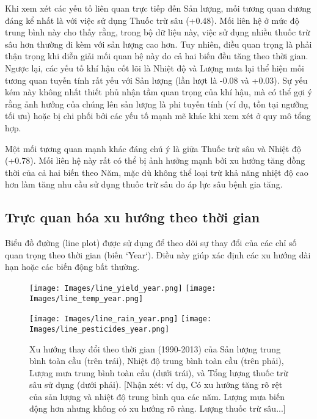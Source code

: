 Khi xem xét các yếu tố liên quan trực tiếp đến Sản lượng, mối tương quan dương đáng kể nhất là với việc sử dụng Thuốc trừ sâu (+0.48). Mối liên hệ ở mức độ trung bình này cho thấy rằng, trong bộ dữ liệu này, việc sử dụng nhiều thuốc trừ sâu hơn thường đi kèm với sản lượng cao hơn. Tuy nhiên, điều quan trọng là phải thận trọng khi diễn giải mối quan hệ này do cả hai biến đều tăng theo thời gian. Ngược lại, các yếu tố khí hậu cốt lõi là Nhiệt độ và Lượng mưa lại thể hiện mối tương quan tuyến tính rất yếu với Sản lượng (lần lượt là -0.08 và +0.03). Sự yếu kém này không nhất thiết phủ nhận tầm quan trọng của khí hậu, mà có thể gợi ý rằng ảnh hưởng của chúng lên sản lượng là phi tuyến tính (ví dụ, tồn tại ngưỡng tối ưu) hoặc bị chi phối bởi các yếu tố mạnh mẽ khác khi xem xét ở quy mô tổng hợp.

Một mối tương quan mạnh khác đáng chú ý là giữa Thuốc trừ sâu và Nhiệt độ (+0.78). Mối liên hệ này rất có thể bị ảnh hưởng mạnh bởi xu hướng tăng đồng thời của cả hai biến theo Năm, mặc dù không thể loại trừ khả năng nhiệt độ cao hơn làm tăng nhu cầu sử dụng thuốc trừ sâu do áp lực sâu bệnh gia tăng.



\subsection{Trực quan hóa xu hướng theo thời gian}
\label{subsec:viz_time_trends}

Biểu đồ đường (line plot) được sử dụng để theo dõi sự thay đổi của các chỉ số quan trọng theo thời gian (biến `Year`). Điều này giúp xác định các xu hướng dài hạn hoặc các biến động bất thường.

\begin{figure}[H]
    \centering
    \texttt{[image: Images/line\_yield\_year.png]}
    \hfill
    \texttt{[image: Images/line\_temp\_year.png]}
    
    \vspace{0.5cm}
    
    \texttt{[image: Images/line\_rain\_year.png]}
     \hfill
    \texttt{[image: Images/line\_pesticides\_year.png]}
   \vspace{8pt}
    \caption{Xu hướng thay đổi theo thời gian (1990-2013) của Sản lượng trung bình toàn cầu (trên trái), Nhiệt độ trung bình toàn cầu (trên phải), Lượng mưa trung bình toàn cầu (dưới trái), và Tổng lượng thuốc trừ sâu sử dụng (dưới phải). [Nhận xét: ví dụ, Có xu hướng tăng rõ rệt của sản lượng và nhiệt độ trung bình qua các năm. Lượng mưa biến động hơn nhưng không có xu hướng rõ ràng. Lượng thuốc trừ sâu...]}
    \label{fig:time_series_plots}
\end{figure}

